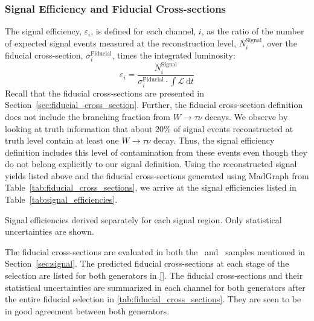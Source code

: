 %

\clearpage
\subsubsection{Signal Efficiency and Fiducial Cross-sections}
\label{sec:signal_efficiency}

The signal efficiency, $\varepsilon_i$, is defined for each channel, $i$,
as the ratio of the number of expected signal events measured
at the reconstruction level, $N_i^{\textrm{Signal}}$, over the fiducial cross-section, $\sigma^{\textrm{Fiducial}}_i$, times the integrated luminosity:
\begin{equation}
\varepsilon_i = \frac{N_i^{\textrm{Signal}}}{\sigma^{\textrm{Fiducial}}_i\cdot\int\mathscr{L}~\textrm{d}t}
\end{equation}
Recall that the fiducial cross-sections are presented in Section~\ref{sec:fiducial_cross_section}. Further, the fiducial cross-section definition
does not include the branching fraction from $W\rightarrow\tau\nu$ decays.
We observe by looking at truth information that about 20\% of signal
events reconstructed at truth level contain at
least one $W\rightarrow\tau\nu$ decay. Thus, the signal efficiency
definition includes this level of contamination from these events
even though they do not belong explicitly to our signal definition.
Using the reconstructed signal yields listed above and the fiducial
cross-sections generated using MadGraph
from Table~\ref{tab:fiducial_cross_sections}, we
arrive at the signal efficiencies listed in Table~\ref{tab:signal_efficiencies}.


\begin{table}[ht!]
\centering

\caption{Signal efficiencies derived separately for each signal region. Only statistical uncertainties are shown.}
\label{tab:signal_efficiencies}
\end{table}




The fiducial cross-sections are evaluated in both 
the \vbfnlo~and \madgraph~samples mentioned in Section~\ref{sec:signal}.
The predicted fiducial cross-sections at each stage of the selection
are listed for both generators in \tab\ref{}.
The fiducial cross-sections and their
statistical uncertainties 
are summarized in each channel for both generators 
after the entire fiducial selection
in \tab\ref{tab:fiducial_cross_sections}.
They are seen to be in good agreement between both generators.


